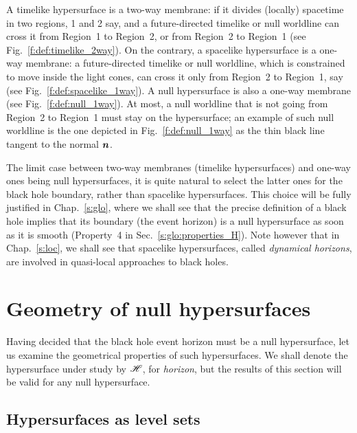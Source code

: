 A timelike hypersurface is a two-way membrane: if it divides (locally)
spacetime in two regions, 1 and 2 say, and a future-directed timelike or null
worldline can cross it from Region~1 to Region~2, or from Region~2 to Region~1
(see Fig.~\ref{f:def:timelike_2way}). On the contrary,
a spacelike hypersurface is a one-way membrane: a future-directed timelike or null
worldline, which is constrained to move inside the light cones,
can cross it only from Region~2 to Region~1, say (see Fig.~\ref{f:def:spacelike_1way}).
A null hypersurface is also a one-way membrane (see Fig.~\ref{f:def:null_1way}).
At most, a null worldline that is not going from Region~2 to Region~1 must
stay on the hypersurface; an example of such null worldline is
the one depicted in Fig.~\ref{f:def:null_1way} as the thin black line tangent to the normal $\bm{n}$.

The limit case between two-way membranes (timelike hypersurfaces)
and one-way ones being null hypersurfaces, it is quite natural to select the
latter ones for the black hole boundary, rather than spacelike hypersurfaces.
This choice will be fully justified in Chap.~\ref{s:glo}, where we shall see
that the precise definition of a black hole implies that its boundary
(the event horizon)
is a null hypersurface as soon as it is smooth (Property~4 in Sec.~\ref{s:glo:properties_H}).
Note however that in Chap.~\ref{s:loc}, we shall see that spacelike hypersurfaces,
called \emph{dynamical
horizons}, are involved
in quasi-local approaches to black holes.


\section{Geometry of null hypersurfaces} \label{s:def:geom_null_hypsurf}

Having decided that the black hole event horizon must be a null hypersurface,
let us examine the geometrical properties of such hypersurfaces. We shall
denote the hypersurface under study by $\mathscr{H}$, for \emph{horizon}, but the results of this section
will be valid for any null hypersurface.

\subsection{Hypersurfaces as level sets}

